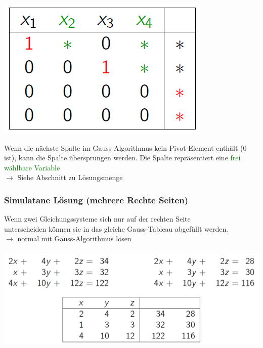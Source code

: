 			\begin{minipage}[b]{.5\linewidth} 
  			\includegraphics[width=\linewidth]{Bilder/RREF-Tableau}
			\end{minipage}
			\hfill
			\begin{minipage}[b]{.45\linewidth} 
  			Wenn die nächste Spalte im Gauss-Algorithmus kein Pivot-Element enthält (0 ist), kann die Spalte 						übersprungen werden. Die Spalte repräsentiert eine 					\textcolor{green}{frei wählbare Variable} \\
			$\rightarrow$ Siehe Abschnitt zu Lösungsmenge\\	
			\end{minipage}			
   		
   			
   			\vfill\null
   			\columnbreak
   		
   		
   		
   		
		    \subsubsection{Simulatane Lösung (mehrere Rechte Seiten)}
		    Wenn zwei Gleichungssysteme sich nur auf der rechten Seite \\
		    unterscheiden können sie in das gleiche Gauss-Tableau abgefüllt werden.\\
		    $\rightarrow$ normal mit Gauss-Algorithmus lösen \\
		    \\
		    \includegraphics[width=0.6\linewidth]{Bilder/mehrere_rechte_seiten}
		    
